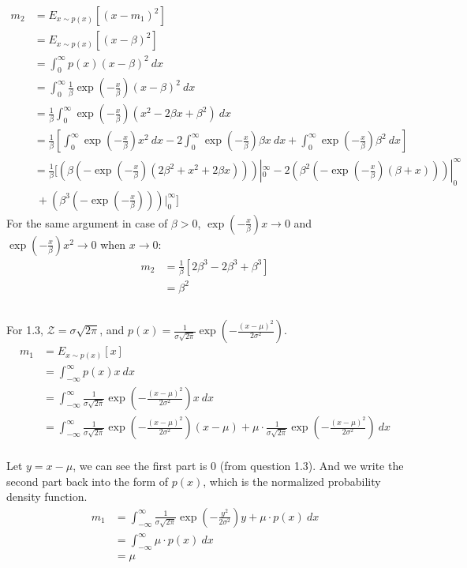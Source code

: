 \begin{align*}
    m_2 &= E_{x \sim p(x)}[(x-m_1)^2] \\
    &= E_{x \sim p(x)}[(x-\beta)^2] \\
    &= \int_0^{\infty} p(x) (x-\beta)^2 \ dx \\
    &= \int_0^{\infty} \frac{1}{\beta} \exp(-\frac{x}{\beta}) (x-\beta)^2 \ dx \\
    &= \frac{1}{\beta} \int_0^{\infty} \exp(-\frac{x}{\beta}) (x^2-2\beta x + \beta^2) \ dx \\
    &= \frac{1}{\beta} [ \int_0^{\infty} \exp(-\frac{x}{\beta}) x^2 \ dx -2 \int_0^{\infty} \exp(-\frac{x}{\beta}) \beta x \ dx + \int_0^{\infty} \exp(-\frac{x}{\beta}) \beta^2 \ dx ] \\
    &= \frac{1}{\beta} [ (\beta(-\exp(-\frac{x}{\beta})(2\beta^2+x^2+2\beta x)))|_0^{\infty} -2 (\beta^2(-\exp(-\frac{x}{\beta})(\beta+x)))|_0^{\infty} \\
    &\  + (\beta^3(-\exp(-\frac{x}{\beta})))|_0^{\infty} ]
\end{align*}
For the same argument in case of $\beta>0$, $\exp(-\frac{x}{\beta}) x \rightarrow 0$ and $\exp(-\frac{x}{\beta}) x^2 \rightarrow 0$ when $x \rightarrow 0$:
\begin{align*}
    m_2 &= \frac{1}{\beta} [ 2 \beta^3 -2 \beta^3 + \beta^3 ] \\
    &= \beta^2
\end{align*}

\subsection{}
For 1.3, $\mathcal{Z} = \sigma \sqrt{2 \pi}$, and $p(x)=\frac{1}{\sigma \sqrt{2 \pi}} \exp(-\frac{(x-\mu)^2}{2 \sigma^2})$.
\begin{align*}
    m_1 &= E_{x \sim p(x)}[x] \\
    &= \int_{-\infty}^{\infty} p(x) x \ dx \\
    &= \int_{-\infty}^{\infty} \frac{1}{\sigma \sqrt{2 \pi}} \exp(-\frac{(x-\mu)^2}{2 \sigma^2}) x \ dx \\
    &= \int_{-\infty}^{\infty} \frac{1}{\sigma \sqrt{2 \pi}} \exp(-\frac{(x-\mu)^2}{2 \sigma^2}) (x-\mu) + \mu \cdot \frac{1}{\sigma \sqrt{2 \pi}} \exp(-\frac{(x-\mu)^2}{2 \sigma^2}) \ dx \\
\end{align*}

Let $y = x - \mu$, we can see the first part is 0 (from question 1.3).
And we write the second part back into the form of $p(x)$, which is the normalized probability density function.
\begin{align*}
    m_1
    &= \int_{-\infty}^{\infty} \frac{1}{\sigma \sqrt{2 \pi}} \exp(-\frac{y^2}{2 \sigma^2}) y + \mu \cdot p(x) \ dx \\
    &= \int_{-\infty}^{\infty} \mu \cdot p(x) \ dx \\
    &= \mu
\end{align*}

